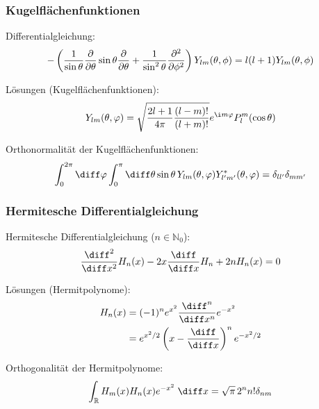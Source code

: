 \documentclass[11pt]{article}
\numberwithin{equation}{section}
\begin{document}
      \subsubsection{Kugelflächenfunktionen}
        Differentialgleichung:
        \begin{equation}
          -\left(
            \frac{1}{\sin\theta}\frac{\partial }{\partial \theta}\sin\theta\frac{\partial }{\partial \theta} + \frac{1}{\sin^2\theta}\frac{\partial^2}{\partial \phi^2}
          \right)
          Y_{lm}(\theta,\phi) = l(l+1)Y_{lm}(\theta,\phi)
        \end{equation}

        Lösungen (Kugelflächenfunktionen):
        \begin{equation} \label{eq:kugelflächenfunktionen}
          Y_{lm}(\theta,\varphi) = \sqrt{\frac{2l+1}{4\pi}\frac{(l-m)!}{(l+m)!}} e^{\i m\varphi} P_l^m(\cos\theta)
        \end{equation}

        Orthonormalität der Kugelflächenfunktionen:
        \begin{equation}
          \int_0^{2\pi}\diff\varphi \int_0^{\pi}\diff\theta \sin\theta\,  Y_{lm}(\theta,\varphi) Y^{*}_{l'm'}(\theta,\varphi) = \delta_{ll'}\delta_{mm'}
        \end{equation}

      \subsubsection{Hermitesche Differentialgleichung}
        Hermitesche Differentialgleichung ($n\in\mathbb{N}_0$):
        \begin{equation}
          \frac{\diff^2}{\diff x^2} H_n(x) -2x\tder{}{x} H_n+2 n H_n(x)=0
        \end{equation}

        Lösungen (Hermitpolynome):
        \begin{equation} \label{eq:Hermitpolynome}
          \begin{aligned}
            H_n(x) &= (-1)^n e^{x^2} \frac{\diff^n}{\diff x^n}e^{-x^2} \\
            &= e^{x^2/2}\left(x-\tder{}{x}\right)^n e^{-x^2/2} \\
          \end{aligned}
        \end{equation}

        Orthogonalität der Hermitpolynome:
        \begin{equation}
          \int_{\mathbb{R}} H_m(x) H_n(x) e^{-x^2}\;\diff x = \sqrt{\pi}\,2^n n!\delta_{nm}
        \end{equation}
\end{document}
